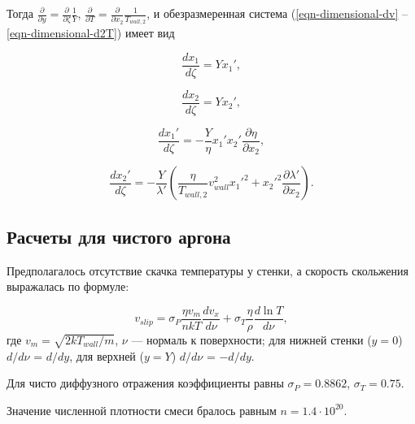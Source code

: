 \documentclass[12pt]{article}
\begin{document}
Тогда $\frac{\partial }{\partial y}=\frac{\partial }{\partial \zeta}\frac{1}{Y}$, $\frac{\partial }{\partial T}=\frac{\partial }{\partial x_{2}}\frac{1}{T_{wall,2}}$, и обезразмеренная система (\ref{eqn-dimensional-dv} -- \ref{eqn-dimensional-d2T}) имеет вид

\begin{equation}
  \frac{d x_{1}}{d \zeta} = Y x_{1}',\label{eqn-dimensionless-dx1}
\end{equation}

\begin{equation}
  \frac{d x_{2}}{d \zeta} = Y x_{2}',\label{eqn-dimensionless-dx2}
\end{equation}

\begin{equation}
  \frac{d x_{1}'}{d \zeta} = -\frac{Y}{\eta}x_{1}'x_{2}'\frac{\partial \eta}{\partial x_{2}},\label{eqn-dimensionless-dx21}
\end{equation}

\begin{equation}
  \frac{d x_{2}'}{d \zeta} = -\frac{Y}{\lambda'}\left(\frac{\eta}{T_{wall,2}}v_{wall}^{2}x_{1}'^2+x_{2}'^{2}\frac{\partial \lambda'}{\partial x_{2}} \right).
\end{equation}

\subsection{Расчеты для чистого аргона}
Предполагалось отсутствие скачка температуры у стенки, а скорость скольжения выражалась по формуле:

\begin{equation}
  v_{slip} = \sigma_{P} \frac{\eta v_{m}}{nkT}\frac{d v_{x}}{d \nu} + \sigma_{T}\frac{\eta}{\rho}\frac{d \ln T}{d \nu},
\end{equation}
где $v_{m} = \sqrt{2kT_{wall} / m}$, $\nu$ --- нормаль к поверхности; для нижней стенки ($y=0$) $d / d \nu$ = $d / d y$, для верхней ($y=Y$) $d / d \nu$ = $-d / d y$.

Для чисто диффузного отражения коэффициенты равны $\sigma_{P} = 0.8862$, $\sigma_{T} = 0.75$.

Значение численной плотности смеси бралось равным $n=1.4 \cdot 10^{20}$.

\end{document}
